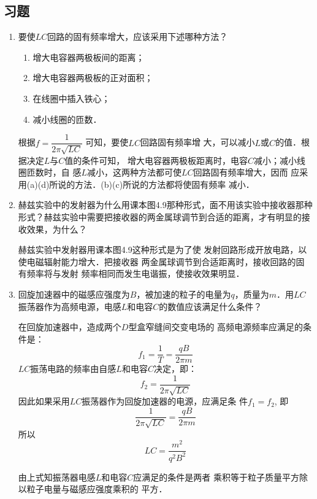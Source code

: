 \subsection{习题}
\begin{enumerate}
	\item 要使$LC$回路的固有频率增大，应该采用下述哪种方法？
	\begin{enumerate}
		\item 增大电容器两极板间的距离；
		\item 增大电容器两极板的正对面积；
		\item 在线圈中插入铁心；
		\item 减小线圈的匝数．
	\end{enumerate}

    \begin{solution}
根据$f=\dfrac{1}{2\pi\sqrt{LC}}$
可知，要使$LC$回路固有频率增
大，可以减小$L$或$C$的值．根据决定$L$与$C$值的条件可知，
增大电容器两极板距离时，电容$C$减小；减小线圈匝数时，自
感$L$减小，这两种方法都可使$LC$回路固有频率增大，因而
应采用(a)(d)所说的方法．(b)(c)所说的方法都将使固有频率
减小．
    \end{solution}
    
	\item 赫兹实验中的发射器为什么用课本图4.9那种形式，面不用该实验中接收器那种形式？赫兹实验中需要把接收器的两金属球调节到合适的距离，才有明显的接收效果，为什么？

    \begin{solution}
        赫兹实验中发射器用课本图4.9这种形式是为了使
        发射回路形成开放电路，以使电磁辐射能力增大．把接收器
        两金属球调节到合适距离时，接收回路的固有频率将与发射
        频率相同而发生电谐振，使接收效果明显．
    \end{solution}
    
	\item 回旋加速器中的磁感应强度为$B$，被加速的粒子的电量为$q$，质量为$m$．用$LC$振荡器作为高频电源，电感$L$和电容$C$的数值应该满足什么条件？

    \begin{solution}
在回旋加速器中，造成两个$D$型盒窄缝间交变电场的
高频电源频率应满足的条件是：
\[f_1=\frac{1}{T}=\frac{qB}{2\pi m}\]
$LC$振荡电路的频率由自感$L$和电容$C$决定，即：
\[f_2=\frac{1}{2\pi\sqrt{LC}}\]
因此如果采用$LC$振荡器作为回旋加速器的电源，应满足条
件$f_1=f_2$, 即
\[\frac{1}{2\pi\sqrt{LC}}=\frac{qB}{2\pi m}\]
所以
\[LC=\frac{m^2}{q^2B^2}\]

由上式知振荡器电感$L$和电容$C$应满足的条件是两者
乘积等于粒子质量平方除以粒子电量与磁感应强度乘积的
平方．
    \end{solution}
    

\end{enumerate}
